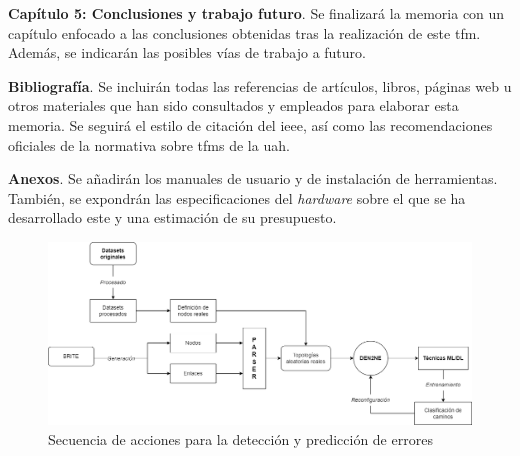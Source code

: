 \begin{description}
    \item\textbf{Capítulo 5: Conclusiones y trabajo futuro}. Se finalizará la memoria con un capítulo enfocado a las conclusiones obtenidas tras la realización de este \gls{tfm}. Además, se indicarán las posibles vías de trabajo a futuro.

    \item[]\textbf{Bibliografía}. Se incluirán todas las referencias de artículos, libros, páginas web u otros materiales que han sido consultados y empleados para elaborar esta memoria. Se seguirá el estilo de citación del \gls{ieee}, así como las recomendaciones oficiales de la normativa sobre \gls{tfm}s de la \gls{uah}. 

    \item[]\textbf{Anexos}. Se añadirán los manuales de usuario y de instalación de herramientas. También, se expondrán las especificaciones del \textit{hardware} sobre el que se ha desarrollado este  y una estimación de su presupuesto.
    
\end{description}

\begin{figure}
    \centering
    \includegraphics[width=1\textwidth]{img/intro/anteproyecto.drawio.png}
    \caption{Secuencia de acciones para la detección y predicción de errores}
    \label{fig:intro}
\end{figure}

